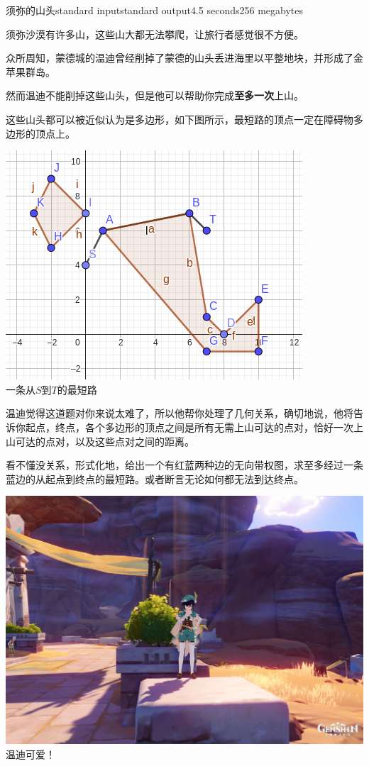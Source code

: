 \begin{problem}{须弥的山头}{standard input}{standard output}{4.5 seconds}{256 megabytes}

须弥沙漠有许多山，这些山大都无法攀爬，让旅行者感觉很不方便。

众所周知，蒙德城的温迪曾经削掉了蒙德的山头丢进海里以平整地块，并形成了金苹果群岛。

然而温迪不能削掉这些山头，但是他可以帮助你完成\textbf{至多一次}上山。

这些山头都可以被近似认为是多边形，如下图所示，最短路的顶点一定在障碍物多边形的顶点上。

\begin{center}
  \includegraphics[scale=0.8]{example.png} \\
  \small{一条从$S$到$T$的最短路}
\end{center}

温迪觉得这道题对你来说太难了，所以他帮你处理了几何关系，确切地说，他将告诉你起点，终点，各个多边形的顶点之间是所有无需上山可达的点对，恰好一次上山可达的点对，以及这些点对之间的距离。

看不懂没关系，形式化地，给出一个有红蓝两种边的无向带权图，求至多经过一条蓝边的从起点到终点的最短路。或者断言无论如何都无法到达终点。

\begin{center}
  \includegraphics[scale=0.15]{venti.jpg} \\
  \small{温迪可爱！}
\end{center}



\end{problem}
